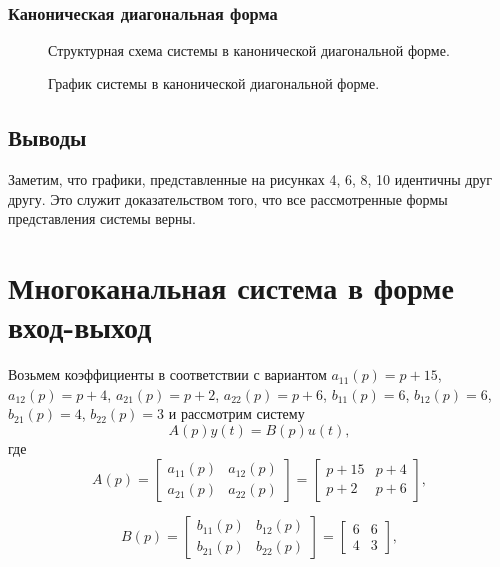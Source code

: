 \documentclass[a5paper, 10pt]{article}
\theoremstyle{definition}
\theoremstyle{plain}
\theoremstyle{remark}
\begin{document}
\newpage
\,
\newpage
\subsubsection{Каноническая диагональная форма}

\begin{figure}[h]
\caption{Структурная схема системы в канонической диагональной форме.}
\end{figure}

\begin{figure}[h]
\caption{График системы в канонической диагональной форме.}
\end{figure}

\newpage
\subsection{Выводы}
Заметим, что графики, представленные на рисунках 4, 6, 8, 10 идентичны друг другу. Это служит доказательством того, что все рассмотренные формы представления системы верны.


\section{Многоканальная система в форме вход-выход}
Возьмем коэффициенты в соответствии с вариантом $a_{11}(p)=p+15$,  $a_{12}(p)=p+4$,  $a_{21}(p)=p+2$,  $a_{22}(p)=p+6$,  $b_{11}(p)=6$,  $b_{12}(p)=6$,  $b_{21}(p)=4$,  $b_{22}(p)=3$ и рассмотрим систему
\begin{equation*}
A(p)y(t)=B(p)u(t),
\end{equation*}
где
\begin{equation*}
A(p) = 
\begin{bmatrix}
a_{11}(p) & a_{12}(p)\\
a_{21}(p) & a_{22}(p)
\end{bmatrix}
=
\begin{bmatrix}
p+15 &p+4\\
p+2 & p+6
\end{bmatrix},
\end{equation*}


\begin{equation*}
B(p) = 
\begin{bmatrix}
b_{11}(p) & b_{12}(p)\\
b_{21}(p) & b_{22}(p)
\end{bmatrix}
=
\begin{bmatrix}
6 &6\\
4 & 3
\end{bmatrix},
\end{equation*}
\end{document}
